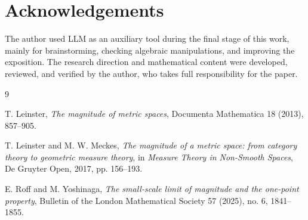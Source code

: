 \documentclass[11pt]{amsart}
\numberwithin{equation}{section}
\theoremstyle{definition}
\theoremstyle{remark}
\begin{document}
\section*{Acknowledgements}

The author used LLM as an auxiliary tool during the final stage of this
work, mainly for brainstorming, checking algebraic manipulations, and improving
the exposition. The research direction and mathematical content were developed,
reviewed, and verified by the author, who takes full responsibility for the
paper.

\begin{thebibliography}{9}

T. Leinster,
\emph{The magnitude of metric spaces},
Documenta Mathematica 18 (2013), 857--905.

T. Leinster and M. W. Meckes,
\emph{The magnitude of a metric space: from category theory to geometric measure theory},
in \emph{Measure Theory in Non-Smooth Spaces},
De Gruyter Open, 2017, pp. 156--193.

E. Roff and M. Yoshinaga,
\emph{The small-scale limit of magnitude and the one-point property},
Bulletin of the London Mathematical Society 57 (2025), no. 6, 1841--1855.

\end{thebibliography}
\end{document}
